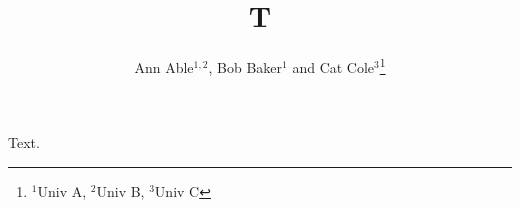 \documentclass{article}
\begin{document}
\title{T}
\author{Ann Able$^{1,2}$, Bob Baker$^{1}$ and Cat Cole$^{3}$\thanks{$^{1}$Univ A, $^{2}$Univ B, $^{3}$Univ C}}
\maketitle
Text.
\end{document}
